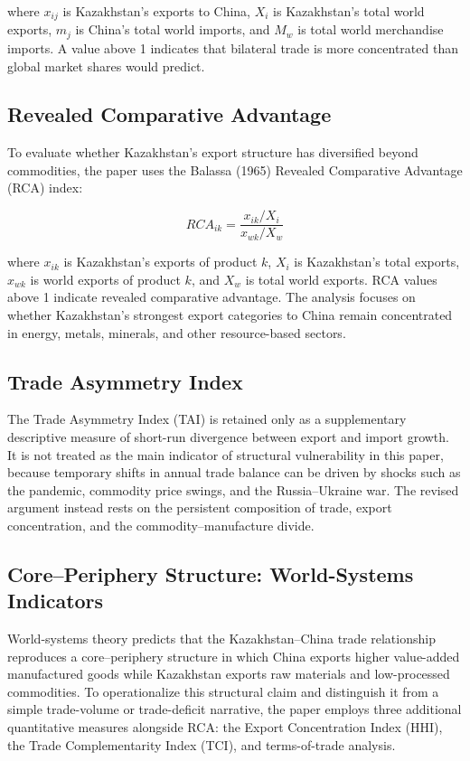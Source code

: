 \documentclass[12pt]{article}
\begin{document}
\noindent where $x_{ij}$ is Kazakhstan's exports to China, $X_i$ is Kazakhstan's total world exports, $m_j$ is China's total world imports, and $M_w$ is total world merchandise imports. A value above 1 indicates that bilateral trade is more concentrated than global market shares would predict.

\subsection{Revealed Comparative Advantage}

To evaluate whether Kazakhstan's export structure has diversified beyond commodities, the paper uses the Balassa (1965) Revealed Comparative Advantage (RCA) index:

\begin{equation}
RCA_{ik} = \frac{x_{ik}/X_i}{x_{wk}/X_w}
\end{equation}

\noindent where $x_{ik}$ is Kazakhstan's exports of product $k$, $X_i$ is Kazakhstan's total exports, $x_{wk}$ is world exports of product $k$, and $X_w$ is total world exports. RCA values above 1 indicate revealed comparative advantage. The analysis focuses on whether Kazakhstan's strongest export categories to China remain concentrated in energy, metals, minerals, and other resource-based sectors.

\subsection{Trade Asymmetry Index}

The Trade Asymmetry Index (TAI) is retained only as a supplementary descriptive measure of short-run divergence between export and import growth. It is not treated as the main indicator of structural vulnerability in this paper, because temporary shifts in annual trade balance can be driven by shocks such as the pandemic, commodity price swings, and the Russia--Ukraine war. The revised argument instead rests on the persistent composition of trade, export concentration, and the commodity--manufacture divide.

\subsection{Core--Periphery Structure: World-Systems Indicators}

World-systems theory predicts that the Kazakhstan--China trade relationship reproduces a core--periphery structure in which China exports higher value-added manufactured goods while Kazakhstan exports raw materials and low-processed commodities. To operationalize this structural claim and distinguish it from a simple trade-volume or trade-deficit narrative, the paper employs three additional quantitative measures alongside RCA: the Export Concentration Index (HHI), the Trade Complementarity Index (TCI), and terms-of-trade analysis.
\end{document}
